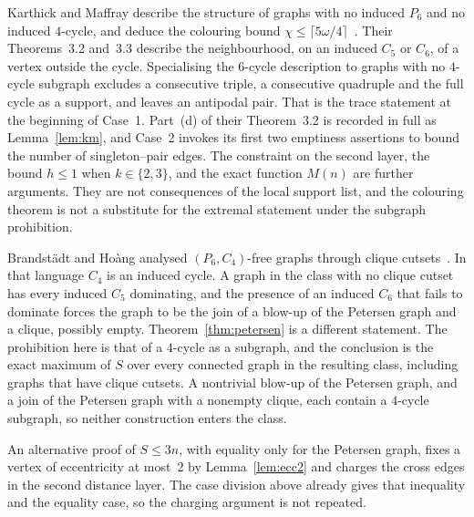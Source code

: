 \documentclass[ASNA]{USG}
\theoremstyle{WBstyletwo}
\numberwithin{equation}{section}
\begin{document}
\begin{remark}\label{rem:km}
Karthick and Maffray describe the structure of graphs with no induced $P_6$ and no induced $4$-cycle, and deduce the colouring bound $\chi\le\lceil 5\omega/4\rceil$~\cite{km}. Their Theorems~3.2 and~3.3 describe the neighbourhood, on an induced $C_5$ or $C_6$, of a vertex outside the cycle. Specialising the $6$-cycle description to graphs with no $4$-cycle subgraph excludes a consecutive triple, a consecutive quadruple and the full cycle as a support, and leaves an antipodal pair. That is the trace statement at the beginning of Case~1. Part~(d) of their Theorem~3.2 is recorded in full as Lemma~\ref{lem:km}, and Case~2 invokes its first two emptiness assertions to bound the number of singleton--pair edges. The constraint on the second layer, the bound $h\le 1$ when $k\in\{2,3\}$, and the exact function $M(n)$ are further arguments. They are not consequences of the local support list, and the colouring theorem is not a substitute for the extremal statement under the subgraph prohibition.
\end{remark}

\begin{remark}\label{rem:bh}
Brandst\"adt and Ho\`ang analysed $(P_6,C_4)$-free graphs through clique cutsets~\cite{bh}. In that language $C_4$ is an induced cycle. A graph in the class with no clique cutset has every induced $C_5$ dominating, and the presence of an induced $C_6$ that fails to dominate forces the graph to be the join of a blow-up of the Petersen graph and a clique, possibly empty. Theorem~\ref{thm:petersen} is a different statement. The prohibition here is that of a $4$-cycle as a subgraph, and the conclusion is the exact maximum of $S$ over every connected graph in the resulting class, including graphs that have clique cutsets. A nontrivial blow-up of the Petersen graph, and a join of the Petersen graph with a nonempty clique, each contain a $4$-cycle subgraph, so neither construction enters the class.
\end{remark}

\begin{remark}\label{rem:layer}
An alternative proof of \(S\le 3n\), with equality only for the Petersen graph, fixes a vertex of eccentricity at most~$2$ by Lemma~\ref{lem:ecc2} and charges the cross edges in the second distance layer. The case division above already gives that inequality and the equality case, so the charging argument is not repeated.
\end{remark}
\end{document}
